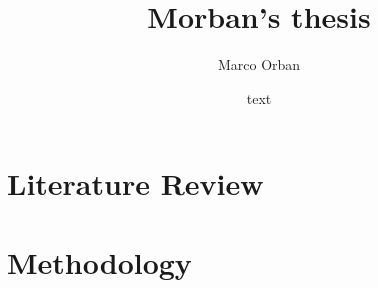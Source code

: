 \documentclass{article}
\title{Morban's thesis}
\author{Marco Orban}
\date{text}
\begin{document}
	
	\maketitle
	
	\section{Literature Review}
	
	
	
	\section{Methodology}
	
	
	
\end{document}
